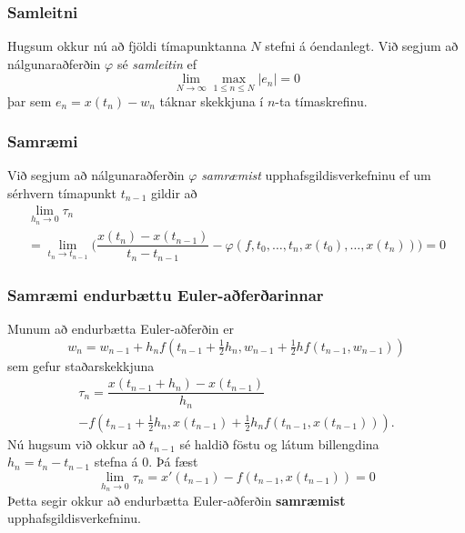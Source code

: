 \documentclass[icelandic,a4paper,12pt]{article}
\begin{document}
\subsubsection{Samleitni}  Hugsum okkur nú að fjöldi tímapunktanna 
$N$ stefni á óendanlegt. Við segjum að nálgunaraðferðin $\varphi$
sé {\it samleitin} ef 
$$
\lim_{N\to \infty} \max\limits_{1\leq n\leq N} |e_n|=0
$$
þar sem $e_n=x(t_n)-w_n$ táknar skekkjuna í $n$-ta tímaskrefinu. 

\pause
\subsubsection{Samræmi}
Við segjum að nálgunaraðferðin $\varphi$
{\it samræmist} upphafsgildisverkefninu ef um sérhvern tímapunkt
$t_{n-1}$  gildir að 
\begin{multline*}
\lim_{h_n\to 0}\tau_n\\
=\lim_{t_n\to t_{n-1}}\bigg(\dfrac{x(t_n)-x(t_{n-1})}{t_n-t_{n-1}}
-\varphi(f,t_{0},\dots,t_n,x(t_{0}),\dots,x(t_{n}))\bigg)
=0  
\end{multline*}




\subsubsection{Samræmi endurbættu Euler-aðferðarinnar} 
Munum að endurbætta Euler-aðferðin er
$$
  w_n=w_{n-1}+h_nf(t_{n-1}+\tfrac 12 h_n,w_{n-1}+\tfrac 12 hf(t_{n-1},w_{n-1}))
$$
sem gefur staðarskekkjuna
\begin{multline*}
\tau_n=\dfrac{x(t_{n-1}+h_n)-x(t_{n-1})}{h_n}\\
-f(t_{n-1}+\tfrac 12 h_n,x(t_{n-1})+\tfrac 12 h_nf(t_{n-1},x(t_{n-1}))).
  \end{multline*}
\pause
Nú hugsum við okkur að $t_{n-1}$ sé haldið föstu og látum billengdina
$h_n=t_n-t_{n-1}$ stefna á $0$.  Þá fæst
$$
  \lim_{h_n\to 0} \tau_n= x'(t_{n-1})-f(t_{n-1},x(t_{n-1}))=0
$$
Þetta segir okkur að endurbætta Euler-aðferðin {\bf samræmist} 
upphafsgildisverkefninu.
\end{document}

